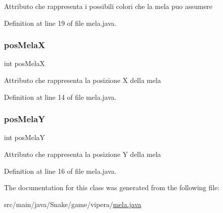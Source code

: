 Attributo che rappresenta i possibili colori che la mela puo\textquotesingle{} assumere 

Definition at line 19 of file mela.\+java.

\mbox{\label{class_snake_1_1game_1_1vipera_1_1mela_a18097b5636ab8e5eaf99d18ffa609a06}} 
\subsubsection{\texorpdfstring{pos\+MelaX}{posMelaX}}
{\footnotesize\ttfamily int pos\+MelaX\hspace{0.3cm}{\ttfamily [private]}}

Attributo che rappresenta la posizione X della mela 

Definition at line 14 of file mela.\+java.

\mbox{\label{class_snake_1_1game_1_1vipera_1_1mela_ac5c78730de1bfb90e34ab5381ea70878}} 
\subsubsection{\texorpdfstring{pos\+MelaY}{posMelaY}}
{\footnotesize\ttfamily int pos\+MelaY\hspace{0.3cm}{\ttfamily [private]}}

Attributo che rappresenta la posizione Y della mela 

Definition at line 16 of file mela.\+java.



The documentation for this class was generated from the following file\+:\begin{DoxyCompactItemize}
\item 
src/main/java/\+Snake/game/vipera/\mbox{\hyperlink{mela_8java}{mela.\+java}}\end{DoxyCompactItemize}
